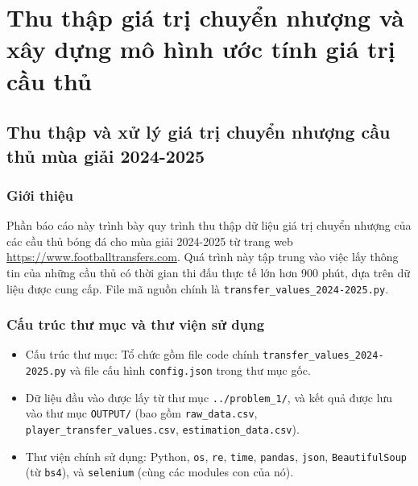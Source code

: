 \documentclass[12pt, a4paper]{report}
\begin{document}
\chapter{Thu thập giá trị chuyển nhượng và xây dựng mô hình ước tính giá trị cầu thủ}

\section{Thu thập và xử lý giá trị chuyển nhượng cầu thủ mùa giải 2024-2025}

\subsection{Giới thiệu}
Phần báo cáo này trình bày quy trình thu thập dữ liệu giá trị chuyển nhượng của các cầu thủ bóng đá cho mùa giải 2024-2025 từ trang web \url{https://www.footballtransfers.com}.
Quá trình này tập trung vào việc lấy thông tin của những cầu thủ có thời gian thi đấu thực tế lớn hơn 900 phút, dựa trên dữ liệu được cung cấp.
File mã nguồn chính là \texttt{transfer\_values\_2024-2025.py}.

\subsection{Cấu trúc thư mục và thư viện sử dụng}
\begin{itemize}
    \item Cấu trúc thư mục: Tổ chức gồm file code chính \texttt{transfer\_values\_2024-2025.py} và file cấu hình \texttt{config.json} trong thư mục gốc.
    \item Dữ liệu đầu vào được lấy từ thư mục \texttt{../problem\_1/}, và kết quả được lưu vào thư mục \texttt{OUTPUT/} (bao gồm \texttt{raw\_data.csv}, \texttt{player\_transfer\_values.csv}, \texttt{estimation\_data.csv}).
    \item {Thư viện chính sử dụng:} Python, \texttt{os}, \texttt{re}, \texttt{time}, \texttt{pandas}, \texttt{json}, \texttt{BeautifulSoup} (từ \texttt{bs4}), và \texttt{selenium} (cùng các modules con của nó).
\end{itemize}
\end{document}
